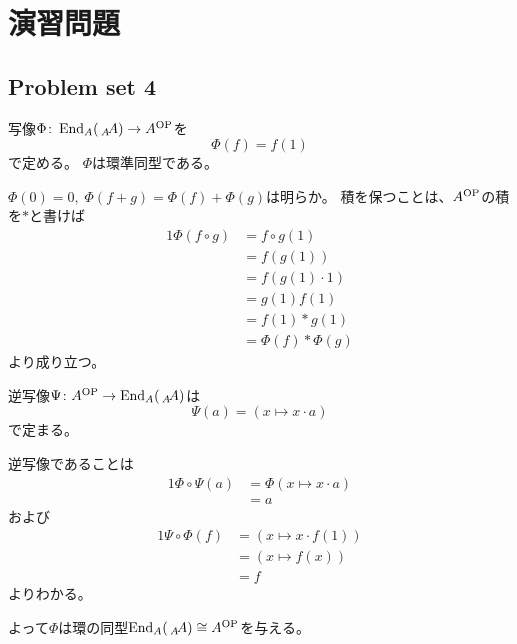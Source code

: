 \documentclass[report]{jlreq}
\begin{document}
%
\newpage
\section{演習問題}

\subsection{Problem set 4}


\begin{answer}
    写像$\Phi \colon \operatorname{End}_A(\,{}_{A}\!A) \to A^{\mathrm{OP}}$を
    \begin{equation}
        \Phi(f) = f(1)
    \end{equation}
    で定める。
    $\Phi$は環準同型である。
    \begin{innerproof}
        $\Phi(0) = 0, \; \Phi(f + g) = \Phi(f) + \Phi(g)$は明らか。
        積を保つことは、$A^{\mathrm{OP}}$の積を$*$と書けば
        \begin{alignat}{1}
            \Phi(f \circ g)
                &= f \circ g (1) \\
                &= f(g(1)) \\
                &= f(g(1) \cdot 1) \\
                &= g(1) f(1) \\
                &= f(1) * g(1) \\
                &= \Phi(f) * \Phi(g)
        \end{alignat}
        より成り立つ。
    \end{innerproof}
    逆写像$\Psi \colon A^{\mathrm{OP}} \to \operatorname{End}_A(\,{}_{A}\!A)$は
    \begin{equation}
        \Psi(a) = (x \mapsto x \cdot a)
    \end{equation}
    で定まる。
    \begin{innerproof}
        逆写像であることは
        \begin{alignat}{1}
            \Phi \circ \Psi(a)
                &= \Phi(x \mapsto x \cdot a) \\
                &= a
        \end{alignat}
        および
        \begin{alignat}{1}
            \Psi \circ \Phi(f)
                &= (x \mapsto x \cdot f(1)) \\
                &= (x \mapsto f(x)) \\
                &= f
        \end{alignat}
        よりわかる。
    \end{innerproof}
    よって$\Phi$は環の同型$\operatorname{End}_A(\,{}_{A}\!A) \cong A^{\mathrm{OP}}$を与える。
\end{answer}
\end{document}
